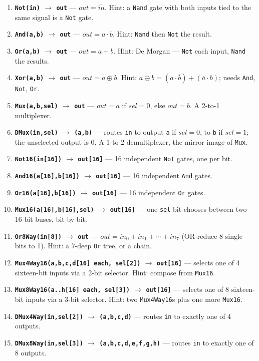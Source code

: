 \documentclass[11pt]{article}
\begin{document}
\begin{enumerate}
  \item \textbf{\texttt{Not(in)} $\to$ \texttt{out}} --- $out = \overline{in}$. Hint: a \texttt{Nand} gate with both inputs tied to the same signal is a \texttt{Not} gate.
  \item \textbf{\texttt{And(a,b)} $\to$ \texttt{out}} --- $out = a \cdot b$. Hint: \texttt{Nand} then \texttt{Not} the result.
  \item \textbf{\texttt{Or(a,b)} $\to$ \texttt{out}} --- $out = a + b$. Hint: De Morgan --- \texttt{Not} each input, \texttt{Nand} the results.
  \item \textbf{\texttt{Xor(a,b)} $\to$ \texttt{out}} --- $out = a \oplus b$. Hint: $a\oplus b = (a \cdot \overline{b}) + (\overline{a} \cdot b)$; needs \texttt{And}, \texttt{Not}, \texttt{Or}.
  \item \textbf{\texttt{Mux(a,b,sel)} $\to$ \texttt{out}} --- $out = a$ if $sel=0$, else $out=b$. A 2-to-1 multiplexer.
  \item \textbf{\texttt{DMux(in,sel)} $\to$ \texttt{(a,b)}} --- routes \texttt{in} to output \texttt{a} if $sel=0$, to \texttt{b} if $sel=1$; the unselected output is 0. A 1-to-2 demultiplexer, the mirror image of \texttt{Mux}.
  \item \textbf{\texttt{Not16(in[16])} $\to$ \texttt{out[16]}} --- 16 independent \texttt{Not} gates, one per bit.
  \item \textbf{\texttt{And16(a[16],b[16])} $\to$ \texttt{out[16]}} --- 16 independent \texttt{And} gates.
  \item \textbf{\texttt{Or16(a[16],b[16])} $\to$ \texttt{out[16]}} --- 16 independent \texttt{Or} gates.
  \item \textbf{\texttt{Mux16(a[16],b[16],sel)} $\to$ \texttt{out[16]}} --- one \texttt{sel} bit chooses between two 16-bit buses, bit-by-bit.
  \item \textbf{\texttt{Or8Way(in[8])} $\to$ \texttt{out}} --- $out = in_0 + in_1 + \cdots + in_7$ (OR-reduce 8 single bits to 1). Hint: a 7-deep \texttt{Or} tree, or a chain.
  \item \textbf{\texttt{Mux4Way16(a,b,c,d[16] each, sel[2])} $\to$ \texttt{out[16]}} --- selects one of 4 sixteen-bit inputs via a 2-bit selector. Hint: compose from \texttt{Mux16}.
  \item \textbf{\texttt{Mux8Way16(a..h[16] each, sel[3])} $\to$ \texttt{out[16]}} --- selects one of 8 sixteen-bit inputs via a 3-bit selector. Hint: two \texttt{Mux4Way16}s plus one more \texttt{Mux16}.
  \item \textbf{\texttt{DMux4Way(in,sel[2])} $\to$ \texttt{(a,b,c,d)}} --- routes \texttt{in} to exactly one of 4 outputs.
  \item \textbf{\texttt{DMux8Way(in,sel[3])} $\to$ \texttt{(a,b,c,d,e,f,g,h)}} --- routes \texttt{in} to exactly one of 8 outputs.
\end{enumerate}
\end{document}
